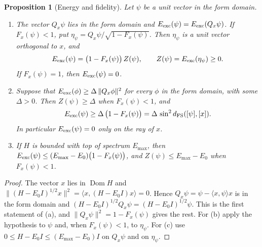 \documentclass[11pt]{article}
\newtheorem{proposition}{Proposition}[section]
\theoremstyle{definition}
\begin{document}
\begin{proposition}[Energy and fidelity]
\label{prop:fidelity-energy}
Let $\psi$ be a unit vector in the form domain.
\begin{enumerate}
\item[(a)] The vector $Q_x\psi$ lies in the form domain and $E_{\rm exc}(\psi)=E_{\rm exc}(Q_x\psi)$. If $F_x(\psi)<1$, put $\eta_\psi=Q_x\psi/\sqrt{1-F_x(\psi)}$. Then $\eta_\psi$ is a unit vector orthogonal to $x$, and
\begin{equation}
 E_{\rm exc}(\psi)=\bigl(1-F_x(\psi)\bigr)\,Z(\psi),\qquad Z(\psi)=E_{\rm exc}(\eta_\psi)\ge0 .
 \label{eq:fidelity-energy-factor}
\end{equation}
If $F_x(\psi)=1$, then $E_{\rm exc}(\psi)=0$.
\item[(b)] Suppose that $E_{\rm exc}(\phi)\ge\Delta\,\|Q_x\phi\|^2$ for every $\phi$ in the form domain, with some $\Delta>0$. Then $Z(\psi)\ge\Delta$ when $F_x(\psi)<1$, and
\begin{equation}
 E_{\rm exc}(\psi)\ge\Delta\,\bigl(1-F_x(\psi)\bigr)=\Delta\,\sin^2d_{\rm FS}([\psi],[x]).
 \label{eq:fidelity-energy-gap}
\end{equation}
In particular $E_{\rm exc}(\psi)=0$ only on the ray of $x$.
\item[(c)] If $H$ is bounded with top of spectrum $E_{\max}$, then $E_{\rm exc}(\psi)\le(E_{\max}-E_0)\bigl(1-F_x(\psi)\bigr)$, and $Z(\psi)\le E_{\max}-E_0$ when $F_x(\psi)<1$.
\end{enumerate}
\end{proposition}
\begin{proof}
The vector $x$ lies in $\operatorname{Dom}H$ and $\|(H-E_0I)^{1/2}x\|^2=\langle x,(H-E_0I)x\rangle=0$. Hence $Q_x\psi=\psi-\langle x,\psi\rangle x$ is in the form domain and $(H-E_0I)^{1/2}Q_x\psi=(H-E_0I)^{1/2}\psi$. This is the first statement of (a), and $\|Q_x\psi\|^2=1-F_x(\psi)$ gives the rest. For (b) apply the hypothesis to $\psi$ and, when $F_x(\psi)<1$, to $\eta_\psi$. For (c) use $0\le H-E_0I\le(E_{\max}-E_0)I$ on $Q_x\psi$ and on $\eta_\psi$.
\end{proof}
\end{document}
